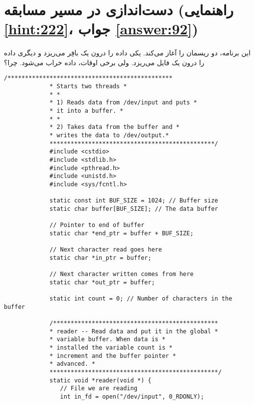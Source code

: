 \section[دست‌اندازی در مسیر مسابقه]{دست‌اندازی در مسیر مسابقه \protect{} (راهنمایی \ref{hint:222}، جواب \ref{answer:92})}
\paragraph{}\label{prog:111}
این برنامه، دو ریسمان را آغاز می‌کند. یکی داده را درون یک بافِر می‌ریزد و دیگری داده را درون یک فایل می‌ریزد. ولی برخی اوقات، داده خراب می‌شود. چرا؟

\begin{LTR}
        \begin{lstlisting}[style=C++Style]
             /***********************************************
             * Starts two threads *
             * *
             * 1) Reads data from /dev/input and puts *
             * it into a buffer. *
             * *
             * 2) Takes data from the buffer and *
             * writes the data to /dev/output.*
             ***********************************************/
             #include <cstdio>
             #include <stdlib.h>
             #include <pthread.h>
             #include <unistd.h>
             #include <sys/fcntl.h>

             static const int BUF_SIZE = 1024; // Buffer size
             static char buffer[BUF_SIZE]; // The data buffer

             // Pointer to end of buffer
             static char *end_ptr = buffer + BUF_SIZE;

             // Next character read goes here
             static char *in_ptr = buffer;

             // Next character written comes from here
             static char *out_ptr = buffer;

             static int count = 0; // Number of characters in the buffer

             /***********************************************
             * reader -- Read data and put it in the global *
             * variable buffer. When data is *
             * installed the variable count is *
             * increment and the buffer pointer *
             * advanced. *
             ************************************************/
             static void *reader(void *) {
             	// File we are reading
             	int in_fd = open("/dev/input", 0_RDONLY);


\end{lstlisting}
\end{LTR}
